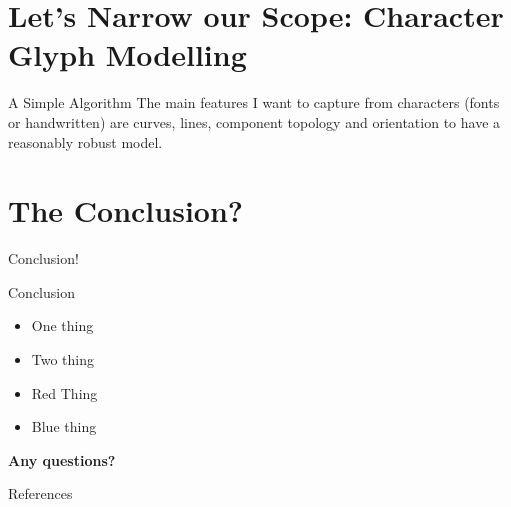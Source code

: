 \documentclass[handout, 10pt]{beamer}
\begin{document}

\section{Let's Narrow our Scope: Character Glyph Modelling}

\begin{frame}{A Simple Algorithm}
	The main features I want to capture from characters (fonts or handwritten) are \alert{curves}, \alert{lines}, \alert{component topology} and \alert{orientation} to have a reasonably robust model.
\end{frame}

\section{The Conclusion?}

\begin{frame}[standout]
Conclusion!
\end{frame}

\begin{frame}{Conclusion}
	\begin{itemize}[<+- | alert@+>]
		\item One thing
		\item Two thing
		\item Red Thing
		\item Blue thing
	\end{itemize}

	\alert{\textbf{Any questions?}}
\end{frame}

\appendix

\begin{frame}[allowframebreaks]{References}

\printbibliography[heading=none]

\end{frame}
\end{document}
